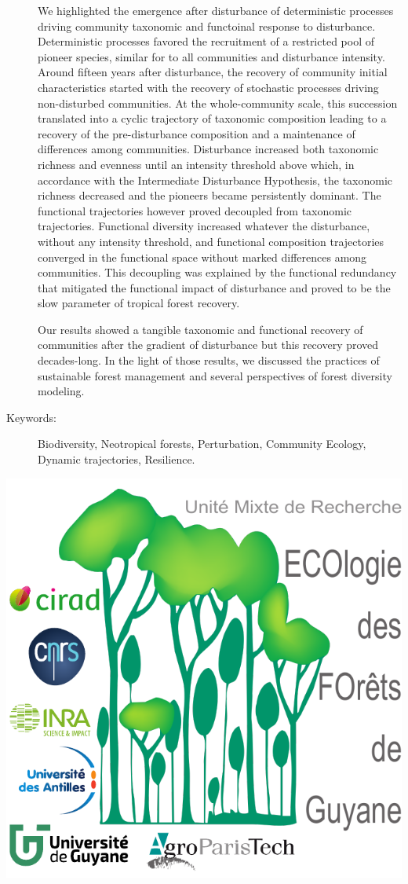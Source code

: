 \documentclass[
  11pt,
  french,
  A4paper,
  extrafontsizes,onecolumn,openright
  ]{memoir}
\begin{document}
\begin{normalsize}
\begin{description}
We highlighted the emergence after disturbance of deterministic
processes driving community taxonomic and functoinal response to
disturbance. Deterministic processes favored the recruitment of a
restricted pool of pioneer species, similar for to all communities and
disturbance intensity. Around fifteen years after disturbance, the
recovery of community initial characteristics started with the recovery
of stochastic processes driving non-disturbed communities. At the
whole-community scale, this succession translated into a cyclic
trajectory of taxonomic composition leading to a recovery of the
pre-disturbance composition and a maintenance of differences among
communities. Disturbance increased both taxonomic richness and evenness
until an intensity threshold above which, in accordance with the
Intermediate Disturbance Hypothesis, the taxonomic richness decreased
and the pioneers became persistently dominant. The functional
trajectories however proved decoupled from taxonomic trajectories.
Functional diversity increased whatever the disturbance, without any
intensity threshold, and functional composition trajectories converged
in the functional space without marked differences among communities.
This decoupling was explained by the functional redundancy that
mitigated the functional impact of disturbance and proved to be the slow
parameter of tropical forest recovery.\newline

Our results showed a tangible taxonomic and functional recovery of
communities after the gradient of disturbance but this recovery proved
decades-long. In the light of those results, we discussed the practices
of sustainable forest management and several perspectives of forest
diversity modeling.

\item[Keywords:]
Biodiversity, Neotropical forests, Perturbation, Community Ecology, Dynamic trajectories, Resilience.

\end{description}

\end{normalsize}

\vspace*{\fill}
\centering\includegraphics[width=.3\textwidth]{images/Logo-Lab}
\end{document}
